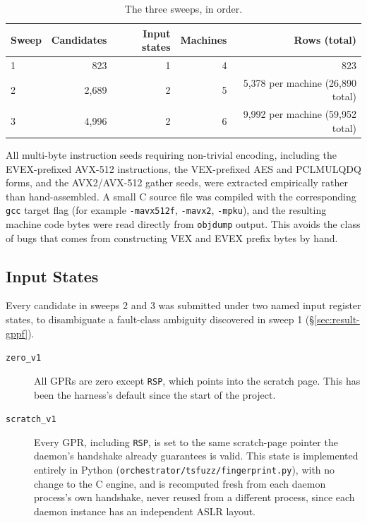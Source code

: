 \documentclass[11pt]{article}
\newcommand{\code}[1]{\texttt{#1}}
\begin{document}
\begin{table}[h]
\centering
\caption{The three sweeps, in order.}
\label{tab:sweeps}
\begin{tabular}{@{}lrrrr@{}}
\toprule
Sweep & Candidates & Input states & Machines & Rows (total) \\
\midrule
1 & 823   & 1 & 4 & 823 \\
2 & 2{,}689 & 2 & 5 & 5{,}378 per machine (26{,}890 total) \\
3 & 4{,}996 & 2 & 6 & 9{,}992 per machine (59{,}952 total) \\
\bottomrule
\end{tabular}
\end{table}

All multi-byte instruction seeds requiring non-trivial encoding,
including the EVEX-prefixed AVX-512 instructions, the VEX-prefixed AES
and PCLMULQDQ forms, and the AVX2/AVX-512 gather seeds, were extracted
empirically rather than hand-assembled. A small C source file was
compiled with the corresponding \code{gcc} target flag (for example
\code{-mavx512f}, \code{-mavx2}, \code{-mpku}), and the resulting machine
code bytes were read directly from \code{objdump} output. This avoids the
class of bugs that comes from constructing VEX and EVEX prefix bytes by
hand.

\subsection{Input States}
\label{sec:states}

Every candidate in sweeps 2 and 3 was submitted under two named input
register states, to disambiguate a fault-class ambiguity discovered in
sweep 1 (\S\ref{sec:result-gppf}).

\begin{description}
  \item[\code{zero\_v1}] All GPRs are zero except \code{RSP}, which
    points into the scratch page. This has been the harness's default
    since the start of the project.
  \item[\code{scratch\_v1}] Every GPR, including \code{RSP}, is set to
    the same scratch-page pointer the daemon's handshake already
    guarantees is valid. This state is implemented entirely in Python
    (\code{orchestrator/tsfuzz/fingerprint.py}), with no change to the C
    engine, and is recomputed fresh from each daemon process's own
    handshake, never reused from a different process, since each daemon
    instance has an independent ASLR layout.
\end{description}
\end{document}
